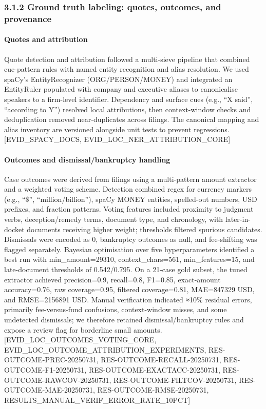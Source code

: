 \subsubsection{3.1.2 Ground truth labeling: quotes, outcomes, and provenance}\label{ground-truth-labeling-quotes-outcomes-and-provenance}

\paragraph{Quotes and attribution}\label{quotes-and-attribution}

Quote detection and attribution followed a multi-sieve pipeline that combined cue-pattern rules with named entity recognition and alias resolution. We used spaCy's EntityRecognizer (ORG/PERSON/MONEY) and integrated an EntityRuler populated with company and executive aliases to canonicalise speakers to a firm-level identifier. Dependency and surface cues (e.g., ``X said'', ``according to Y'') resolved local attributions, then context-window checks and deduplication removed near-duplicates across filings. The canonical mapping and alias inventory are versioned alongside unit tests to prevent regressions. {[}EVID\_SPACY\_DOCS, EVID\_LOC\_NER\_ATTRIBUTION\_CORE{]}

\paragraph{Outcomes and dismissal/bankruptcy handling}\label{outcomes-and-dismissalbankruptcy-handling}

Case outcomes were derived from filings using a multi-pattern amount extractor and a weighted voting scheme. Detection combined regex for currency markers (e.g., ``\$'', ``million/billion''), spaCy MONEY entities, spelled-out numbers, USD prefixes, and fraction patterns. Voting features included proximity to judgment verbs, deception/remedy terms, document type, and chronology, with later-in-docket documents receiving higher weight; thresholds filtered spurious candidates. Dismissals were encoded as 0, bankruptcy outcomes as null, and fee-shifting was flagged separately. Bayesian optimisation over five hyperparameters identified a best run with min\_amount=29310, context\_chars=561, min\_features=15, and late-document thresholds of 0.542/0.795. On a 21-case gold subset, the tuned extractor achieved precision=0.9, recall=0.8, F1=0.85, exact-amount accuracy=0.76, raw coverage=0.95, filtered coverage=0.81, MAE=847329 USD, and RMSE=2156891 USD. Manual verification indicated ≈10\% residual errors, primarily fee-versus-fund confusions, context-window misses, and some undetected dismissals; we therefore retained dismissal/bankruptcy rules and expose a review flag for borderline small amounts. {[}EVID\_LOC\_OUTCOMES\_VOTING\_CORE, EVID\_LOC\_OUTCOME\_ATTRIBUTION\_EXPERIMENTS, RES-OUTCOME-PREC-20250731, RES-OUTCOME-RECALL-20250731, RES-OUTCOME-F1-20250731, RES-OUTCOME-EXACTACC-20250731, RES-OUTCOME-RAWCOV-20250731, RES-OUTCOME-FILTCOV-20250731, RES-OUTCOME-MAE-20250731, RES-OUTCOME-RMSE-20250731, RESULTS\_MANUAL\_VERIF\_ERROR\_RATE\_10PCT{]}

